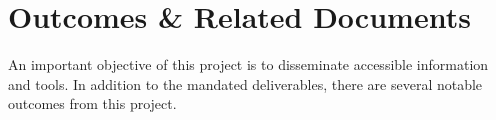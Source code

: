 \section{Outcomes \& Related Documents}

An important objective of this project is to disseminate accessible information and tools. In addition to the mandated deliverables, there are several notable outcomes from this project. 












